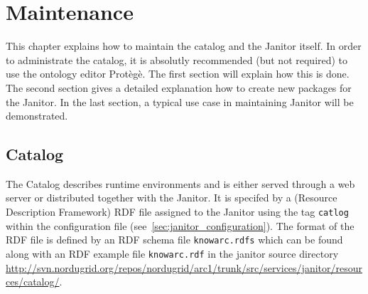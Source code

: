 \chapter{Maintenance}

This chapter explains how to maintain the catalog and the Janitor itself. 
In order to administrate the catalog, it is absolutly recommended (but not required) to use the ontology editor Prot\`eg\`e. The first
section will explain how this is done.
The second section gives a detailed explanation how to create new packages for the Janitor.
In the last section, a typical use case in maintaining Janitor will be demonstrated.


\section{Catalog}\label{sec:catalog}

The Catalog describes runtime environments and is either served through a web server or distributed
together with the Janitor.  It is specifed by a (Resource Description Framework) RDF file assigned to 
the Janitor using the tag \texttt{catlog} within the configuration file (see~\ref{sec:janitor_configuration}). 
The format of the RDF file is defined by an RDF schema file \texttt{knowarc.rdfs}
which can be found along with an RDF example file \texttt{knowarc.rdf} in the janitor source directory
\href{http://svn.nordugrid.org/repos/nordugrid/arc1/trunk/src/services/janitor/resources/catalog/}
{http://svn.nordugrid.org/repos/nordugrid/arc1/trunk/src/services/janitor/resources/catalog/}.\\


